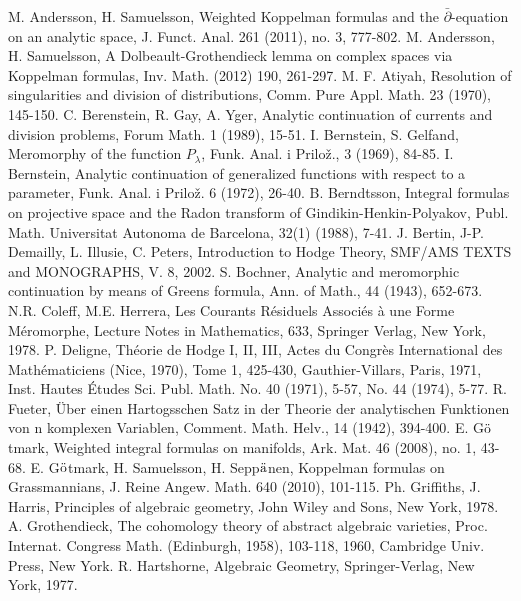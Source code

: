 \documentclass[11pt,reqno]{amsart}
\numberwithin{equation}{section}
\begin{document}
\begin{thebibliography}{WIDT}
 M. Andersson, H. Samuelsson, Weighted Koppelman formulas and
the $\bar\partial$-equation on an analytic space, J. Funct. Anal. 261 (2011), no. 3, 777-802.
 M. Andersson, H. Samuelsson, A Dolbeault-Grothendieck lemma on complex spaces via Koppelman formulas, Inv. Math. (2012) 190, 261-297.
 M. F. Atiyah, Resolution of singularities and division of distributions,
Comm. Pure Appl. Math. 23 (1970), 145-150.
 C. Berenstein, R. Gay, A. Yger, Analytic continuation of currents
and division problems, Forum Math. 1 (1989), 15-51.
 I. Bernstein, S. Gelfand, Meromorphy of the function $P_{\lambda}$,
Funk. Anal. i Prilo\v z., 3 (1969), 84-85.
 I. Bernstein, Analytic continuation of generalized functions with respect
to a parameter, Funk. Anal. i Prilo\v z. 6 (1972), 26-40.
 B. Berndtsson, Integral formulas on projective space and the Radon
transform of Gindikin-Henkin-Polyakov, Publ. Math. Universitat Autonoma de Barcelona,
32(1) (1988), 7-41.
 J. Bertin, J-P. Demailly, L. Illusie, C. Peters,
Introduction to Hodge Theory, SMF/AMS TEXTS and MONOGRAPHS, V. 8, 2002.
 S. Bochner, Analytic and meromorphic continuation by means of Greens formula, Ann. of Math., 44 (1943), 652-673.
 N.R. Coleff, M.E. Herrera, Les Courants R\'esiduels Associ\'es \`a une Forme
M\'eromorphe, Lecture Notes in Mathematics, 633, Springer Verlag, New York, 1978.
 P. Deligne, Th\'eorie de Hodge I, II, III,
Actes du Congr\`es International des Math\'ematiciens (Nice, 1970), Tome 1, 425-430,
Gauthier-Villars, Paris, 1971, Inst. Hautes \'Etudes Sci. Publ. Math. No. 40 (1971), 5-57,
No. 44 (1974), 5-77.
 R. Fueter, \"Uber einen Hartogsschen Satz in der Theorie der analytischen Funktionen von n komplexen Variablen, Comment. Math. Helv., 14 (1942), 394-400.
 E. G$\ddot{\text o}$tmark, Weighted integral formulas on manifolds,
Ark. Mat. 46 (2008), no. 1, 43-68.
 E. G$\ddot{\text o}$tmark, H. Samuelsson, H. Sepp$\ddot{\text a}$nen,
Koppelman formulas on Grassmannians, J. Reine Angew. Math. 640 (2010), 101-115.
 Ph. Griffiths, J. Harris, Principles of algebraic geometry,
John Wiley and Sons, New York, 1978.
 A. Grothendieck, The cohomology theory of abstract algebraic varieties,
Proc. Internat. Congress Math. (Edinburgh, 1958), 103-118, 1960,
Cambridge Univ. Press, New York.
 R. Hartshorne, Algebraic Geometry, Springer-Verlag, New York, 1977.

\end{thebibliography}
\end{document}
